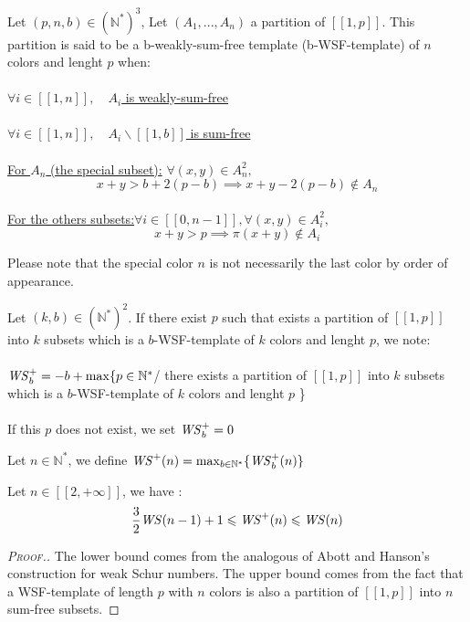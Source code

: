 \begin{definition}
Let \( (p,n,b) \in (\mathbb{N}^*)^3\), Let \((A_1,...,A_n)\) a partition of  \([\![1, p]\!]\).
This partition is said to be a b-weakly-sum-free template (b-WSF-template) of \(n\) colors and lenght \(p\) when:
\\\\
\underline{\(\forall i \in [\![1, n]\!], \quad A_i\) is weakly-sum-free}
\\\\
\underline{\(\forall i \in [\![1, n]\!], \quad A_i\backslash [\![1, b]\!]\) is sum-free}
\\\\
\underline{For \(A_n\) (the special subset):} \quad \(\forall (x,y) \in A_n^2,\)
\\
\[x+y>b+2(p-b) \implies x+y-2(p-b)\notin A_n\]
\\
\underline{For the others subsets:}\quad \(\forall i \in [\![0,n-1]\!], \forall(x,y) \in A_i^2,\)
\\
\[
x+y>p \implies \pi(x+y) \notin A_i
\]
\end{definition}

Please note that the special color \(n\) is not necessarily the last color by order of appearance.

\begin{definition}
Let \( (k,b) \in (\mathbb{N}^*)^2\). If there exist \(p\) such that exists a partition of \([\![1, p]\!]\) into \(k\)
subsets which is a \(b\)-WSF-template of \(k\) colors and lenght \(p\), we note:
\\\\\(\mathit{WS}_b^+=-b+\max \{p\in \mathbb{N}^*\)/ there exists a partition of \([\![1, p]\!]\) into \(k\) subsets which is a
\(b\)-WSF-template of \(k\) colors and lenght \(p\) \}
\\\\
If this \(p\) does not exist, we set \(\mathit{WS}_b^+= 0\)
\end{definition}

\begin{definition}
Let \( n \in \mathbb{N}^*\), we define \(\mathit{WS}^+(n)=\max_{b\in \mathbb{N}^*} \{\mathit{WS}_b^+(n)\}\)
\end{definition}

\begin{proposition}
	Let \(n \in [\![2, +\infty]\!]\), we have :
	\[
	\frac{3}{2} \mathit{WS} (n-1)+1 \leqslant \mathit{WS}^+(n) \leqslant \mathit{WS} (n)
	\]
\end{proposition}

\begin{proof}[\textsc{Proof.}]
The lower bound comes from the analogous of Abott and Hanson's construction for weak Schur numbers.
The upper bound comes from the fact that a WSF-template of length \(p\) with \(n\) colors is also a partition of
\([\![1, p]\!]\) into \(n\) sum-free subsets.
\end{proof}

